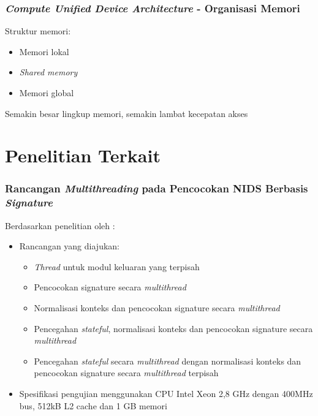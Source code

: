 \documentclass{beamer}
\begin{document}

  \begin{frame}
  \frametitle{\emph{Compute Unified Device Architecture} - Organisasi Memori}
  Struktur memori:
  \begin{itemize}
    \item Memori lokal
    \item \emph{Shared memory}
    \item Memori global
  \end{itemize}

  Semakin besar lingkup memori, semakin lambat kecepatan akses
  \end{frame}

\section{Penelitian Terkait}


  \begin{frame}
  \frametitle{Rancangan \emph{Multithreading} pada Pencocokan NIDS Berbasis \emph{Signature}}
  Berdasarkan penelitian oleh \cite{multi2004}:
  \begin{itemize}
    \item Rancangan yang diajukan:
    \begin{itemize}
      \item \emph{Thread} untuk modul keluaran yang terpisah
      \item Pencocokan signature secara \emph{multithread}
      \item Normalisasi konteks dan pencocokan signature secara \emph{multithread}
      \item Pencegahan \emph{stateful}, normalisasi konteks dan pencocokan signature secara \emph{multithread}
      \item Pencegahan \emph{stateful} secara \emph{multithread} dengan normalisasi konteks dan pencocokan signature secara \emph{multithread} terpisah
    \end{itemize}
    \item Spesifikasi pengujian menggunakan CPU Intel Xeon 2,8 GHz dengan 400MHz bus, 512kB L2 cache dan 1 GB memori
  \end{itemize}
  \end{frame}
\end{document}
